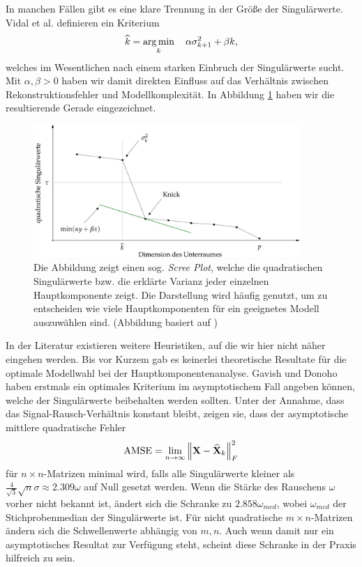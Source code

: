 In manchen Fällen gibt es eine klare Trennung in der Größe der Singulärwerte. Vidal et al. \cite{vidal} definieren ein Kriterium
\begin{align}
\widehat{k} = \operatorname*{arg\,min}_{k} \quad \alpha\sigma_{k+1}^2 + \beta k,
\end{align}
welches im Wesentlichen nach einem starken Einbruch der Singulärwerte sucht. Mit $\alpha, \beta > 0$ haben wir damit direkten Einfluss auf das Verhältnis zwischen Rekonstruktionsfehler und Modellkomplexität. In Abbildung \ref{scree_plot} haben wir die resultierende Gerade eingezeichnet.

\begin{figure}
\includegraphics[width=0.9\textwidth]{figures/scree_plot_explanation.jpg}
\caption{Die Abbildung zeigt einen sog. \textit{Scree Plot}, welche die quadratischen Singulärwerte bzw. die erklärte Varianz jeder einzelnen Hauptkomponente zeigt. Die Darstellung wird häufig genutzt, um zu entscheiden wie viele Hauptkomponenten für ein geeignetes Modell auszuwählen sind. (Abbildung basiert auf \cite{vidal})}
\label{scree_plot}
\end{figure}

In der Literatur existieren weitere Heuristiken, auf die wir hier nicht näher eingehen werden. Bis vor Kurzem gab es keinerlei theoretische Resultate für die optimale Modellwahl bei der Hauptkomponentenanalyse. Gavish und Donoho \cite{gavish} haben erstmals ein optimales Kriterium im asymptotischem Fall angeben können, welche der Singulärwerte beibehalten werden sollten. Unter der Annahme, dass das Signal-Rausch-Verhältnis konstant bleibt, zeigen sie, dass der asymptotische mittlere quadratische Fehler 
$$\operatorname{AMSE} = \lim_{n \rightarrow \infty} \left\lVert \mathbf{X} - \widehat{\mathbf{X}}_k \right\rVert_{F}^{2}$$
für $n \times n$-Matrizen minimal wird, falls alle Singulärwerte kleiner als $\frac{4}{\sqrt{3}}\sqrt{n}\sigma \approx 2.309\omega$ auf Null gesetzt werden. Wenn die Stärke des Rauschens $\omega$ vorher nicht bekannt ist, ändert sich die Schranke zu $2.858\omega_{med}$, wobei $\omega_{med}$ der Stichprobenmedian der Singulärwerte ist. Für nicht quadratische $m \times n$-Matrizen ändern sich die Schwellenwerte abhängig von $m,n$. Auch wenn damit nur ein asymptotisches Resultat zur Verfügung steht, scheint diese Schranke in der Praxis hilfreich zu sein.


